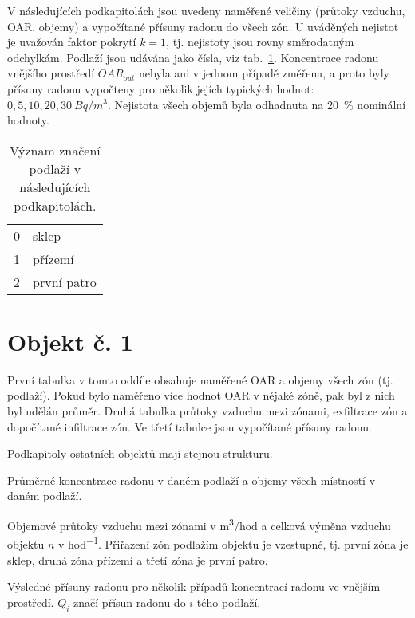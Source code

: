 V následujících podkapitolách jsou uvedeny naměřené veličiny (průtoky vzduchu, OAR, objemy) a vypočítané přísuny radonu do všech zón. U uváděných nejistot je uvažován faktor pokrytí $k=1$, tj. nejistoty jsou rovny směrodatným odchylkám. Podlaží jsou udávána jako čísla, viz tab.~\ref{tab:rovMer_podlazi}. Koncentrace radonu vnějšího prostředí $OAR_{out}$ nebyla ani v jednom případě změřena, a proto byly přísuny radonu vypočteny pro několik jejích typických hodnot: $0, 5, 10, 20, 30\ \si{Bq/m^3}$. Nejistota všech objemů byla odhadnuta na 20~\% nominální hodnoty.
\begin{table}[ht]
	\centering
	\caption{Význam značení podlaží v následujících podkapitolách.}
	\label{tab:rovMer_podlazi}
	\begin{tabular}{ll}
		\toprule
		0&sklep\\
		1&přízemí\\
		2&první patro\\
		\bottomrule
	\end{tabular}
\end{table}

\section{Objekt č. 1}
První tabulka v tomto oddíle obsahuje naměřené OAR a objemy všech zón (tj. podlaží). Pokud bylo naměřeno více hodnot OAR v nějaké zóně, pak byl z nich byl udělán průměr. Druhá tabulka průtoky vzduchu mezi zónami, exfiltrace zón a dopočítané infiltrace zón. Ve třetí tabulce jsou vypočítané přísuny radonu. 

Podkapitoly ostatních objektů mají stejnou strukturu.
\begin{table}[H]
	\centering
	\caption{Průměrné koncentrace radonu v daném podlaží a objemy všech místností v daném podlaží.}
	
\end{table}
\begin{table}[H]
	\centering
    \caption{Objemové průtoky vzduchu mezi zónami v \si{m^3/hod} a celková výměna vzduchu objektu $n$ v \si{hod^{-1}}. Přiřazení zón podlažím objektu je vzestupné, tj. první zóna je sklep, druhá zóna přízemí a třetí zóna je první patro.}
	
\end{table}
\begin{table}[ht]
	\centering
	\caption{Výsledné přísuny radonu pro několik případů koncentrací radonu ve vnějším prostředí. $Q_i$ značí přísun radonu do $i$-tého podlaží.}
    \label{tab:rovMer_Q_1}
	
\end{table}

